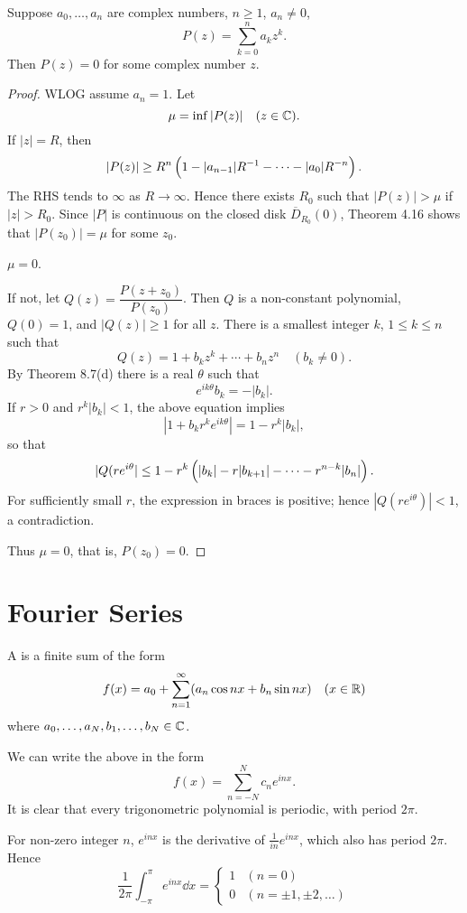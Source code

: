 \begin{theorem}
Suppose $a_0,\dots,a_n$ are complex numbers, $n\ge1$, $a_n\neq0$,
\[P(z)=\sum_{k=0}^n a_kz^k.\]
Then $P(z)=0$ for some complex number $z$.
\end{theorem}

\begin{proof}
WLOG assume $a_n=1$. Let
\[\mu=\inf|P(z)|\quad(z\in\mathbb C).\]
If $|z|=R$, then
\[|P(z)|\ge R^n\left(1-|a_{n-1}|R^{-1}-\cdots-|a_0|R^{-n}\right).\]
The RHS tends to $\infty$ as $R\to\infty$. Hence there exists $R_0$ such that $|P(z)|>\mu$ if $|z|>R_0$. Since $|P|$ is continuous on the closed disk $\overline{D}_{R_0}(0)$, Theorem 4.16 shows that $|P(z_0)|=\mu$ for some $z_0$.

\begin{claim}
$\mu=0$.
\end{claim}
If not, let $Q(z)=\dfrac{P(z+z_0)}{P(z_0)}$. Then $Q$ is a non-constant polynomial, $Q(0)=1$, and $|Q(z)|\ge1$ for all $z$. There is a smallest integer $k$, $1\le k\le n$ such that
\[Q(z)=1+b_kz^k+\cdots+b_nz^n\quad(b_k\neq0).\]
By Theorem 8.7(d) there is a real $\theta$ such that
\[e^{ik\theta}b_k=-|b_k|.\]
If $r>0$ and $r^k|b_k|<1$, the above equation implies
\[|1+b_kr^ke^{ik\theta}|=1-r^k|b_k|,\]
so that
\[|Q(re^{i\theta}|\le 1-r^k\left(|b_k|-r|b_{k+1}|-\cdots-r^{n-k}|b_n|\right).\]
For sufficiently small $r$, the expression in braces is positive; hence $|Q(re^{i\theta})|<1$, a contradiction.

Thus $\mu=0$, that is, $P(z_0)=0$.
\end{proof}
\pagebreak

\section{Fourier Series}
\begin{definition}
A  is a finite sum of the form
\[f(x)=a_0+\sum_{n=1}^\infty(a_n\cos nx+b_n\sin nx)\quad(x\in\mathbb R)\]
where $a_0,\dots,a_N,b_1,\dots,b_N\in\mathbb C$.
\end{definition}

We can write the above in the form
\[f(x)=\sum_{n=-N}^N c_ne^{inx}.\]
It is clear that every trigonometric polynomial is periodic, with period $2\pi$.

For non-zero integer $n$, $e^{inx}$ is the derivative of $\frac{1}{in}e^{inx}$, which also has period $2\pi$. Hence
\[\frac{1}{2\pi}\int_{-\pi}^{\pi}e^{inx}\dd{x}=\begin{cases}
1&(n=0)\\
0&(n=\pm1,\pm2,\dots)
\end{cases}\]

